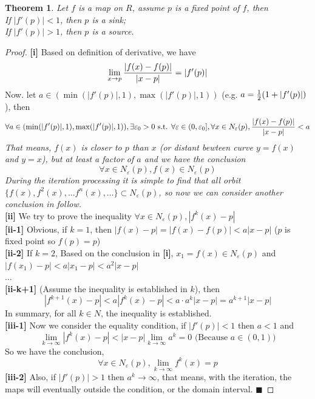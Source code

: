 \documentclass[12pt]{article}
\theoremstyle{plain}
\newtheorem{theorem}{\textbf{Theorem}}[section]
\newtheorem{proof}{\textit{PROOF}}[section]
\begin{document}
\newpage

\begin{theorem} \label{sink-source-point}Let $f$ is a map on $R$, assume $p$ is a fixed point of $f$, then
\\\noindent [i] If $|f'(p)| < 1$, then $p$ is a sink;
\\\noindent [ii] If $|f'(p)| > 1$, then $p$ is a source.
\end{theorem}


{\color{blue}
\begin{proof} \textbf{[i]} Based on definition of derivative, we have
$$
\lim_{x \rightarrow p} {|f(x) - f(p)| \over |x - p|} = |f'(p)|
$$
Now. let $a \in (\min(|f'(p)|, 1), \max(|f'(p)|, 1))$ (e.g. $a = {1\over 2}(1+ |f'(p)|)$), then
$$
\forall a \in (\min(|f'(p)|, 1), \max(|f'(p)|, 1)), \exists \varepsilon_0 > 0 \text{ s.t. } \forall \varepsilon \in (0, \varepsilon_0], \forall x \in N_\varepsilon(p), {|f(x) - f(p)| \over |x - p|} < a
$$
            \textit{That means, $f(x)$ is closer to $p$ than $x$ (or distant bewteen curve $y = f(x)$ and $y = x$), but at least a factor of $a$ and we have the conclusion
$$
\forall x \in N_\varepsilon(p), f(x) \in N_\varepsilon(p)
$$
            During the iteration processing it is simple to find that all orbit $\{f(x), f^2(x), \ldots f^n(x), \ldots\} \subset N_\varepsilon(p)$, so now we can consider another conclusion in follow.}
\\[2ex]\noindent \textbf{[ii]} We try to prove the inequality $\forall x \in N_\varepsilon(p), |f^k(x) - p|$
\\\noindent \textbf{[ii-1]} Obvious, if $k = 1$, then $|f(x) - p| = |f(x) - f(p)| < a |x-p|$ ($p$ is fixed point so $f(p) = p$)
\\\noindent \textbf{[ii-2]} If $k = 2$, Based on the conclusion in \textbf{[i]}, $x_1 = f(x) \in N_\varepsilon(p)$ and $|f(x_1) - p| < a |x_1 - p| < a^2 |x - p|$
\\\noindent $\ldots$
\\\noindent \textbf{[ii-k+1]} (Assume the inequality is established in $k$), then
$$
|f^{k+1}(x) - p| < a|f^k(x) - p| < a \cdot a^k |x - p| = a^{k+1}|x - p|
$$
            In summary, for all $k \in N$, the inequality is established.
\\[2ex]\noindent \textbf{[iii-1]} Now we consider the equality condition, if $|f'(p)| < 1$ then $a < 1$ and  
$$
\lim_{k \rightarrow \infty}|f^{k}(x) - p| < |x-p|\lim_{k \rightarrow \infty} a^k = 0 \text{ (Because }a \in (0, 1)\text{)} 
$$
            So we have the conclusion, 
$$
\forall x \in N_\varepsilon(p), \lim_{k \rightarrow \infty}f^k(x) = p
$$
            \textbf{[iii-2]} Also, if $|f'(p)| > 1$ then $a^k \rightarrow \infty$, that means, with the iteration, the maps will eventually outside the condition, or the domain interval. $\blacksquare$
\end{proof}
}
\end{document}
